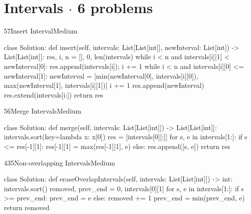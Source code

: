 \section{Intervals {\normalsize\color{muted}$\cdot$ 6 problems}}

\begin{problem}{57}{Insert Interval}{Medium}
\begin{code}
class Solution:
    def insert(self, intervals: List[List[int]], newInterval: List[int]) -> List[List[int]]:
        res, i, n = [], 0, len(intervals)
        while i < n and intervals[i][1] < newInterval[0]:
            res.append(intervals[i]); i += 1
        while i < n and intervals[i][0] <= newInterval[1]:
            newInterval = [min(newInterval[0], intervals[i][0]),
                           max(newInterval[1], intervals[i][1])]
            i += 1
        res.append(newInterval)
        res.extend(intervals[i:])
        return res
\end{code}
\end{problem}

\begin{problem}{56}{Merge Intervals}{Medium}
\begin{code}
class Solution:
    def merge(self, intervals: List[List[int]]) -> List[List[int]]:
        intervals.sort(key=lambda x: x[0])
        res = [intervals[0][:]]
        for s, e in intervals[1:]:
            if s <= res[-1][1]:
                res[-1][1] = max(res[-1][1], e)
            else:
                res.append([s, e])
        return res
\end{code}
\end{problem}

\begin{problem}{435}{Non-overlapping Intervals}{Medium}
\begin{code}
class Solution:
    def eraseOverlapIntervals(self, intervals: List[List[int]]) -> int:
        intervals.sort()
        removed, prev_end = 0, intervals[0][1]
        for s, e in intervals[1:]:
            if s >= prev_end:
                prev_end = e
            else:
                removed += 1
                prev_end = min(prev_end, e)
        return removed
\end{code}
\end{problem}

